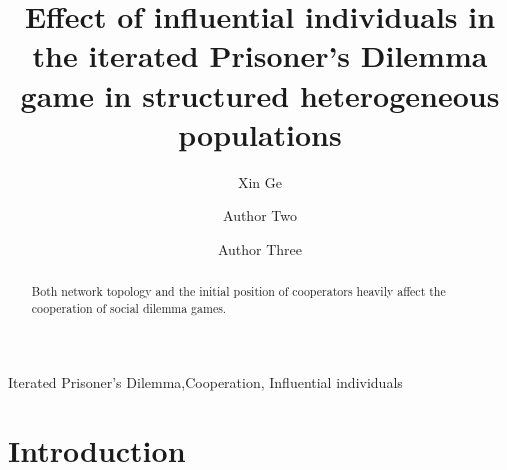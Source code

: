 \documentclass[preprint,12pt,3p]{elsarticle}
\begin{document}
\begin{frontmatter}

\title{Effect of influential individuals in the iterated Prisoner's Dilemma game in structured heterogeneous populations}

\author[label1]{Xin Ge}
\address[label1]{DaLian Maritime University, School of Information Science and
technology, DaLian 116026, P.R. China}
\address[label2]{Address Two}



\author[Hui Li]{Author Two}
\address[label5]{Some University}

\author[label1,label5]{Author Three}

\begin{abstract}
Both network topology and the initial position of cooperators heavily affect the cooperation of social dilemma games.
\end{abstract}

\begin{keyword}
Iterated Prisoner’s Dilemma,Cooperation, Influential individuals
\end{keyword}

\end{frontmatter}

\newcommand{\cooplevel}{Asymptotic density of cooperators $\mathcal{C}$ on the T-S plane}

\section{Introduction}
\end{document}
